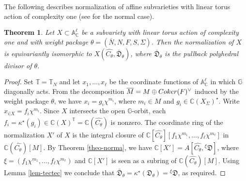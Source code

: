 \documentclass[11pt, reqno]{amsart}
\theoremstyle{plain}
\newtheorem{theorem}{Theorem}[section]
\theoremstyle{definition}
\theoremstyle{remark}
\begin{document}
The following describes normalization of affine subvarieties with linear torus action of complexity one (see \cite[Section 4.2]{AIPSV12} for the normal case).
\begin{theorem}\label{theo-aff-impl}
Let $X\subset \mathbb{A}^{\ell}_{\mathbb{C}}$ be a subvariety with linear torus action of complexity one
and with weight package $\theta =  (\overline{N}, N, F, S, \Sigma)$. Then 
the normalization of $X$ is equivariantly isomorphic to $X(\widehat{C_{\theta}}, \bar{\mathfrak{D}}_{\theta})$, where $\bar{\mathfrak{D}}_{\theta}$ is the pullback polyhedral divisor of $\theta$.
\end{theorem}
\begin{proof}
Set $\mathbb{T} =  \mathbb{T}_{N}$  and
let $x_{1}, \ldots, x_{\ell}$ be the coordinate functions  of $\mathbb{A}^{\ell}_{\mathbb{C}}$ in which $\mathbb{G}$ diagonally acts.
From the decomposition $\overline{M}  =  M\oplus {\rm Coker}(F)^{\vee}$ induced by the weight package $\theta$, we
 have
$x_{i} =  g_{i} \chi^{m_{i}}$, where $m_{i}\in M$ and $g_{i}\in \mathbb{C}(X_{\Sigma})^{\star}$.
Write $x_{i|X} =  f_{i}\chi^{m_{i}}$.  Since $X$ intersects the open $\mathbb{G}$-orbit, each $f_{i} =  \kappa^{\star}(g_{i}) \in \mathbb{C}(X)^{\mathbb{T}}  = \mathbb{C}(\widehat{C_{\theta}})$ is nonzero.
 The coordinate ring of the normalization $X'$ of $X$ is the integral closure of 
$\mathbb{C}[\widehat{C_{\theta}}][f_{1}\chi^{m_{1}}, \ldots, f_{\ell} \chi^{m_{\ell}}]$
in $\mathbb{C}(\widehat{C_{\theta}})[M]$. By Theorem \ref{theo-norma}, we have $\mathbb{C}[X'] =  A[\widehat{C_{\theta}}, {}^{\xi}\mathfrak{D}]$, where $\xi =  (f_{1}\chi^{m_{1}}, \ldots, f_{\ell} \chi^{m_{\ell}})$ and $\mathbb{C}[X']$ is seen as a subring of $\mathbb{C}(\widehat{C_{\theta}})[M]$. Using Lemma \ref{lem-tectec} we conclude that $\bar{\mathfrak{D}}_{\theta} = \kappa^{\star}(\mathfrak{D}_{\theta}) =  {}^{\xi}\mathfrak{D}$, as required. 
\end{proof}
\end{document}
